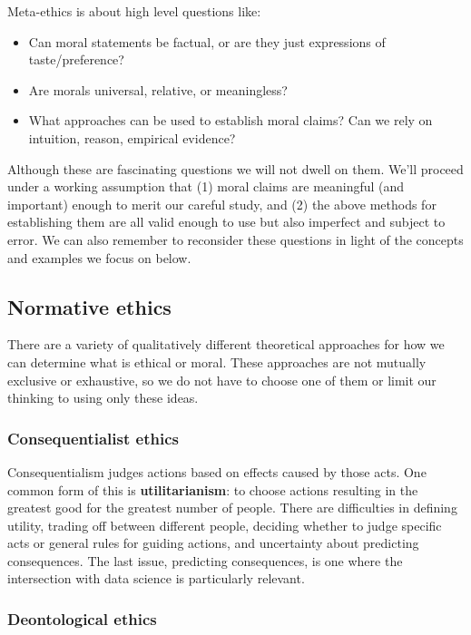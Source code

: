 \documentclass[]{book}
\providecommand{\tightlist}{%
  \setlength{\itemsep}{0pt}\setlength{\parskip}{0pt}}
\theoremstyle{definition}
\theoremstyle{definition}
\theoremstyle{definition}
\theoremstyle{remark}
\begin{document}
Meta-ethics is about high level questions like:

\begin{itemize}
\tightlist
\item
  Can moral statements be factual, or are they just expressions of
  taste/preference?
\item
  Are morals universal, relative, or meaningless?
\item
  What approaches can be used to establish moral claims? Can we rely on
  intuition, reason, empirical evidence?
\end{itemize}

Although these are fascinating questions we will not dwell on them.
We'll proceed under a working assumption that (1) moral claims are
meaningful (and important) enough to merit our careful study, and (2)
the above methods for establishing them are all valid enough to use but
also imperfect and subject to error. We can also remember to reconsider
these questions in light of the concepts and examples we focus on below.

\subsection{Normative ethics}\label{normative-ethics}

There are a variety of qualitatively different theoretical approaches
for how we can determine what is ethical or moral. These approaches are
not mutually exclusive or exhaustive, so we do not have to choose one of
them or limit our thinking to using only these ideas.

\subsubsection{Consequentialist ethics}\label{consequentialist-ethics}

Consequentialism judges actions based on effects caused by those acts.
One common form of this is \textbf{utilitarianism}: to choose actions
resulting in the greatest good for the greatest number of people. There
are difficulties in defining utility, trading off between different
people, deciding whether to judge specific acts or general rules for
guiding actions, and uncertainty about predicting consequences. The last
issue, predicting consequences, is one where the intersection with data
science is particularly relevant.

\subsubsection{Deontological ethics}\label{deontological-ethics}
\end{document}
